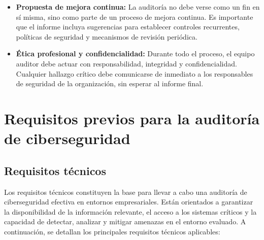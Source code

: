 \documentclass[a4paper, 10pt]{article}
\begin{document}
\begin{itemize}
        \item \textbf{Propuesta de mejora continua:}  
        La auditoría no debe verse como un fin en sí misma, sino como parte de un proceso de mejora continua. Es importante que el informe incluya sugerencias para establecer controles recurrentes, políticas de seguridad y mecanismos de revisión periódica.
    
        \item \textbf{Ética profesional y confidencialidad:}  
        Durante todo el proceso, el equipo auditor debe actuar con responsabilidad, integridad y confidencialidad. Cualquier hallazgo crítico debe comunicarse de inmediato a los responsables de seguridad de la organización, sin esperar al informe final.
    
    \end{itemize}
    
 
    \clearpage
    
    
    








\section{Requisitos previos para la auditoría de ciberseguridad}




\subsection{Requisitos técnicos}

Los requisitos técnicos constituyen la base para llevar a cabo una auditoría de ciberseguridad efectiva en entornos empresariales. Están orientados a garantizar la disponibilidad de la información relevante, el acceso a los sistemas críticos y la capacidad de detectar, analizar y mitigar amenazas en el entorno evaluado. A continuación, se detallan los principales requisitos técnicos aplicables:
\end{document}
